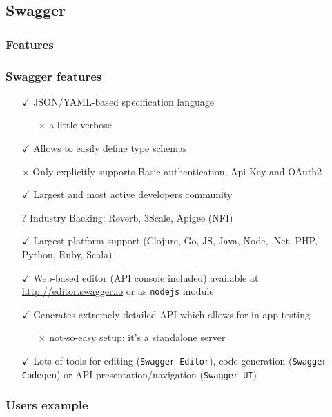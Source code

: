 \subsection{Swagger}

\subsubsection{Features}

\begin{frame} %
	\frametitle{Swagger features}
	
	\begin{itemize}
		\item[$\checkmark$] JSON/YAML-based specification language
		\begin{itemize}
			\item[$\times$] a little verbose
		\end{itemize} 
		\item[$\checkmark$] Allows to easily define type schemas
		\item[$\times$] Only explicitly supports Basic authentication, Api Key and OAuth2
		\item[$\checkmark$] Largest and most active developers community
		\item[?] Industry Backing: Reverb, 3Scale, Apigee (NFI)
		\item[$\checkmark$] Largest platform support (Clojure, Go, JS, Java, Node, .Net, PHP, Python, Ruby, Scala)
		\item[$\checkmark$] Web-based editor (API console included) available at \url{http://editor.swagger.io} or as \texttt{nodejs} module
		\item[$\checkmark$] Generates extremely detailed API which allows for in-app testing
		\begin{itemize}
			\item[$\times$] not-so-easy setup: it's a standalone server
		\end{itemize} 
		\item[$\checkmark$] Lots of tools for editing (\texttt{Swagger Editor}), code generation (\texttt{Swagger Codegen}) or API presentation/navigation (\texttt{Swagger UI})
	\end{itemize}
\end{frame}

\subsubsection{Users example}

